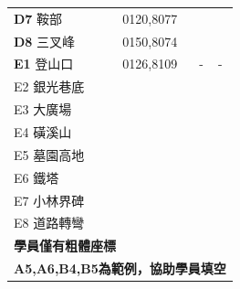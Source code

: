 \documentclass{article}
\begin{document}
\begin{CJK*}{UTF8}{bkai}
\begin{multicols}{2}
\begin{tabular}{|l|c|c|l|}
	\textbf{D7} 鞍部&0120,8077& &\\
	\textbf{D8} 三叉峰& 0150,8074 & &\\
	\hline
	\textbf{E1} 登山口&0126,8109&-&-\\
	E2 銀光巷底& & &\\
	E3 大廣場& & &\\
	E4 磺溪山& & &\\
	E5 墓園高地& & &\\
	E6 鐵塔& & &\\
	E7 小林界碑& & &\\
	E8 道路轉彎& & &\\
	\hline
	\multicolumn{4}{l}{\textbf{學員僅有粗體座標}}\\
	\multicolumn{4}{l}{\textbf{A5,A6,B4,B5為範例，協助學員填空}}
\end{tabular}
\end{multicols}
\end{CJK*}
\end{document}
